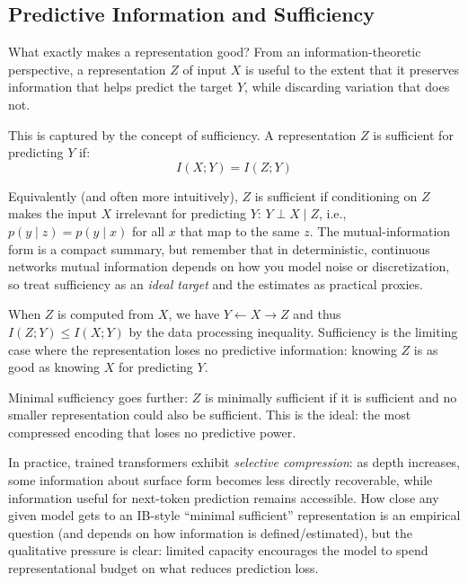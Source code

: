 \vspace{1.5em}

\subsection{Predictive Information and Sufficiency}

What exactly makes a representation good? From an information-theoretic perspective, a representation $Z$ of input $X$ is useful to the extent that it preserves information that helps predict the target $Y$, while discarding variation that does not.

This is captured by the concept of sufficiency. A representation $Z$ is sufficient for predicting $Y$ if:
\begin{equation}
I(X; Y) = I(Z; Y)
\end{equation}

Equivalently (and often more intuitively), $Z$ is sufficient if conditioning on $Z$ makes the input $X$ irrelevant for predicting $Y$: $Y \perp X \mid Z$, i.e., $p(y\mid z)=p(y\mid x)$ for all $x$ that map to the same $z$. The mutual-information form is a compact summary, but remember that in deterministic, continuous networks mutual information depends on how you model noise or discretization, so treat sufficiency as an \emph{ideal target} and the estimates as practical proxies.

When $Z$ is computed from $X$, we have $Y \leftarrow X \rightarrow Z$ and thus $I(Z;Y) \le I(X;Y)$ by the data processing inequality. Sufficiency is the limiting case where the representation loses no predictive information: knowing $Z$ is as good as knowing $X$ for predicting $Y$.

Minimal sufficiency goes further: $Z$ is minimally sufficient if it is sufficient and no smaller representation could also be sufficient. This is the ideal: the most compressed encoding that loses no predictive power.

In practice, trained transformers exhibit \emph{selective compression}: as depth increases, some information about surface form becomes less directly recoverable, while information useful for next-token prediction remains accessible. How close any given model gets to an IB-style ``minimal sufficient'' representation is an empirical question (and depends on how information is defined/estimated), but the qualitative pressure is clear: limited capacity encourages the model to spend representational budget on what reduces prediction loss.

